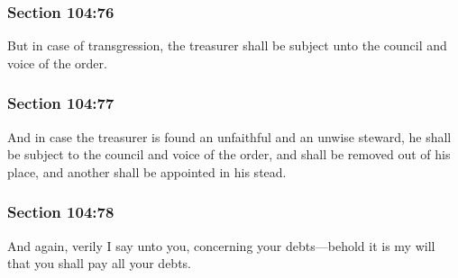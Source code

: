 	\subsubsection{Section 104:76} %
		\label{DC104-76}

		But in case of transgression, the treasurer shall be subject unto the council and voice of the order.


	\subsubsection{Section 104:77} %
		\label{DC104-77}

		And in case the treasurer is found an unfaithful and an unwise steward, he shall be subject to the council and voice of the order, and shall be removed out of his place, and another shall be appointed in his stead.


	\subsubsection{Section 104:78} %
		\label{DC104-78}

		And again, verily I say unto you, concerning your debts---behold it is my will that you shall pay all your debts.



